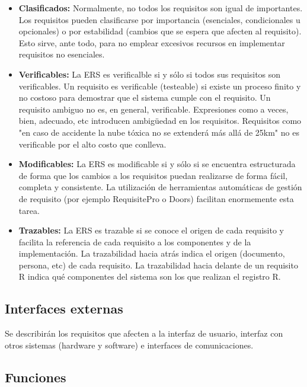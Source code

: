 \documentclass[12pt,a4paper, twosite]{article}
\begin{document}
\begin{itemize}
\begin{itemize}
\item \textbf{Clasificados:} Normalmente, no todos los requisitos son igual de
importantes. Los requisitos pueden clasificarse por importancia
(esenciales, condicionales u opcionales) o por estabilidad (cambios
que se espera que afecten al requisito). Esto sirve, ante todo,
para no emplear excesivos recursos en implementar requisitos no
esenciales.

\item \textbf{Verificables:} La ERS es verificalble si y sólo si todos sus
requisitos son verificables. Un requisito es verificable
(testeable) si existe un proceso finito y no costoso para
demostrar que el sistema cumple con el requisito. Un requisito
ambiguo no es, en general, verificable. Expresiones como a veces,
bien, adecuado, etc introducen ambigüedad en los
requisitos. Requisitos como "en caso de accidente la nube tóxica
no se extenderá más allá de 25km" no es verificable por el alto
costo que conlleva.

\item \textbf{Modificables:} La ERS es modificable si y sólo si se encuentra
estructurada de forma que los cambios a los requisitos puedan
realizarse de forma fácil, completa y consistente. La utilización
de herramientas automáticas de gestión de requisito (por ejemplo
RequisitePro o Doors) facilitan enormemente esta tarea.

\item \textbf{Trazables:} La ERS es trazable si se conoce el origen de cada
requisito y facilita la referencia de cada requisito a los
componentes y de la implementación. La trazabilidad hacia atrás
indica el origen (documento, persona, etc) de cada requisito. La
trazabilidad hacia delante de un requisito R indica qué
componentes del sistema son los que realizan el registro R.
\end{itemize}
\end{itemize}


\subsection{Interfaces externas}
\label{sec:orgfd5391f}

Se describirán los requisitos que afecten a la interfaz de usuario,
interfaz con otros sistemas (hardware y software) e interfaces de comunicaciones.


\subsection{Funciones}
\label{sec:org307bb59}
\end{document}
